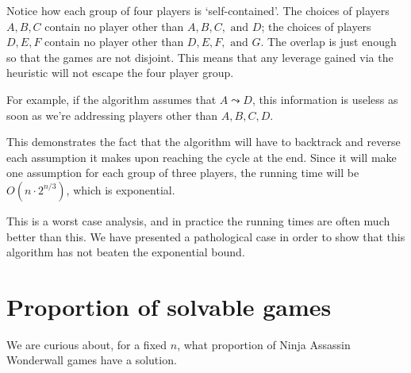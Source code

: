 \documentclass[12pt,x11names, rgb]{article}
\begin{document}
    Notice how each group of four players is `self-contained'. The choices of players $A,B,C$ contain no player other than $A,B,C, \text{ and } D$; the choices of players $D, E, F$ contain no player other than $D, E, F, \text{ and } G$. The overlap is just enough so that the games are not disjoint. This means that any leverage gained via the heuristic will not escape the four player group.

    For example, if the algorithm assumes that $A \leadsto D$, this information is useless as soon as we're addressing players other than $A,B,C,D$.

    This demonstrates the fact that the algorithm will have to backtrack and reverse each assumption it makes upon reaching the cycle at the end. Since it will make one assumption for each group of three players, the running time will be $O(n \cdot 2^{n/3})$, which is exponential. 

    This is a worst case analysis, and in practice the running times are often much better than this. We have presented a pathological case in order to show that this algorithm has not beaten the exponential bound.

\begin{comment}
\section{Overview: Steiner Triple Systems}
    Definition, examples
    discuss how the number of pairs dominates the number of players
    (this defeats our heuristic)
    A slightly better algorithm could `outsmart' our trap from the previous section, but the existence of Steiner Triple Systems shows that we can have so few repeated pairs as to render the heuristic useless. STS shows that this is a systemic problem. 
\end{comment}

\section{Proportion of solvable games}
    \label{sec:prob}
    We are curious about, for a fixed $n$, what proportion of Ninja Assassin Wonderwall games have a solution. 
\end{document}
